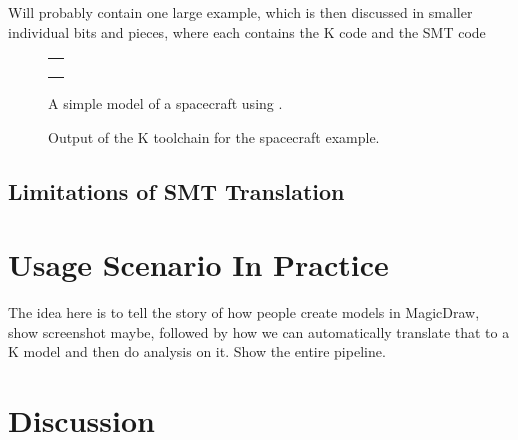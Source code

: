 \documentclass{llncs}
\begin{document}
Will probably contain one large example, which is then discussed in
smaller individual bits and pieces, where each contains the K code and
the SMT code

\begin{figure}
\centering
\begin{tabular}{c}
\hline \\
 \\ \\
\hline
\end{tabular}
\caption{A simple model of a spacecraft using \Klang{}.}
\label{fig:spacecraftSmt}
\end{figure}

\begin{figure}
\caption{Output of the K toolchain for the spacecraft example.}
\label{fig:shapes}
\end{figure}

\subsection{Limitations of SMT Translation}

\section{Usage Scenario In Practice}

The idea here is to tell the story of how people create models in
MagicDraw, show screenshot maybe, followed by how we can automatically
translate that to a K model and then do analysis on it. Show the
entire pipeline.

\section{Discussion}








\appendix


\end{document}
